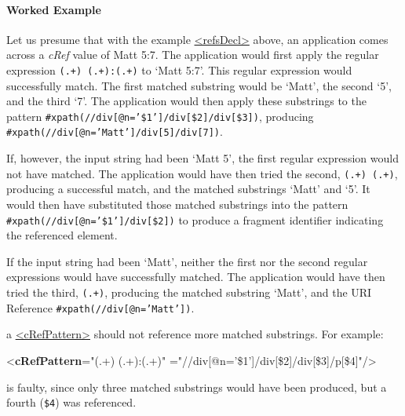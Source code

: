 \paragraph[{Worked Example}]{Worked Example}\label{SACRWE}\par
Let us presume that with the example \hyperref[TEI.refsDecl]{<refsDecl>} above, an application comes across a {\itshape cRef} value of Matt 5:7. The application would first apply the regular expression \texttt{(.+) (.+):(.+)} to ‘Matt 5:7’. This regular expression would successfully match. The first matched substring would be ‘Matt’, the second ‘5’, and the third ‘7’. The application would then apply these substrings to the pattern \texttt{\#xpath(//div[@n='\$1']/div[\$2]/div[\$3])}, producing \texttt{\#xpath(//div[@n='Matt']/div[5]/div[7])}.\par
If, however, the input string had been ‘Matt 5’, the first regular expression would not have matched. The application would have then tried the second, \texttt{(.+) (.+)}, producing a successful match, and the matched substrings ‘Matt’ and ‘5’. It would then have substituted those matched substrings into the pattern \texttt{\#xpath(//div[@n='\$1']/div[\$2])} to produce a fragment identifier indicating the referenced element.\par
If the input string had been ‘Matt’, neither the first nor the second regular expressions would have successfully matched. The application would have then tried the third, \texttt{(.+)}, producing the matched substring ‘Matt’, and the URI Reference \texttt{\#xpath(//div[@n='Matt'])}.\par
a \hyperref[TEI.cRefPattern]{<cRefPattern>} should not reference more matched substrings. For example: \par\bgroup{}\exampleFont \begin{shaded}\noindent\mbox{}{<\textbf{cRefPattern}\hspace*{1em}{matchPattern}="{(.+) (.+):(.+)}"\mbox{}\newline 
\hspace*{1em}{replacementPattern}="{//div[@n='\$1']/div[\$2]/div[\$3]/p[\$4]}"/>}\end{shaded}\egroup\par \noindent  is faulty, since only three matched substrings would have been produced, but a fourth (\texttt{\$4}) was referenced.
